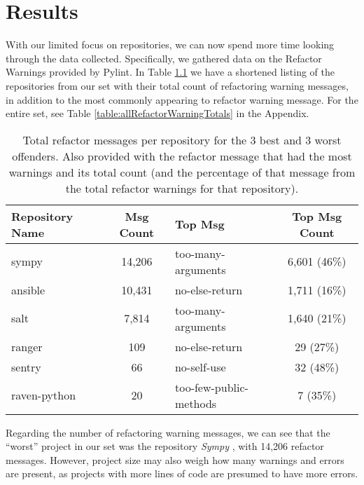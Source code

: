 \chapter{Results} \label{chapterResults}


With our limited focus on repositories, we can now spend more time looking through the data collected. Specifically, we gathered data on the Refactor Warnings provided by Pylint. In Table \ref{table:smallRefactorWarningTotals} we have a shortened listing of the repositories from our set with their total count of refactoring warning messages, in addition to the most commonly appearing to refactor warning message. For the entire set, see Table \ref{table:allRefactorWarningTotals} in the Appendix.

\begin{table}[ht]
  \small
  \centering
  \begin{tabularx}{1.0\textwidth} {
    | l 
    | c
    | >{\centering\arraybackslash}X 
    | c |
  }
    \hline
    Repository Name & Msg Count & Top Msg & Top Msg Count \\
    \hline\hline
    sympy & 14,206 & too-many-arguments & 6,601 (46\%) \\ \hline
    ansible &  10,431 & no-else-return & 1,711 (16\%) \\ \hline
    salt &  7,814 & too-many-arguments & 1,640 (21\%) \\ \hline \hline
    ranger & 109 & no-else-return & 29 (27\%) \\ \hline
    sentry & 66 & no-self-use & 32 (48\%) \\ \hline
    raven-python & 20 & too-few-public-methods & 7 (35\%) \\ \hline
  \end{tabularx}
  \caption{Total refactor messages per repository for the 3 best and 3 worst offenders. Also provided with the refactor message that had the most warnings and its total count (and the percentage of that message from the total refactor warnings for that repository).}
  \label{table:smallRefactorWarningTotals}
\end{table}

Regarding the number of refactoring warning messages, we can see that the ``worst'' project in our set was the repository \emph{Sympy} \cite{data:sympy}, with 14,206 refactor messages. However, project size may also weigh how many warnings and errors are present, as projects with more lines of code are presumed to have more errors.

